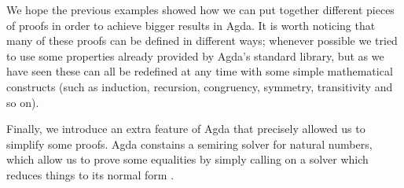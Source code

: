 {We hope the previous examples showed how we can put together different pieces of proofs in order to achieve bigger results in Agda. It is worth noticing that many of these proofs can be defined in different ways; whenever possible we tried to use some properties already provided by Agda's standard library, but as we have seen these can all be redefined at any time with some simple mathematical constructs (such as induction, recursion, congruency, symmetry, transitivity and so on).

Finally, we introduce an extra feature of Agda that precisely allowed us to simplify some proofs. Agda constains a semiring solver for natural numbers, which allow us to prove some equalities by simply calling on a solver which reduces things to its normal form \cite{2018UsingSolver}.

\begin{code}%
\>[0]\AgdaSpace{}%
\<%
\\
\>[0]\AgdaSpace{}%
\<%
\\
\>[0][@{}l@{\AgdaIndent{0}}]%
\>[2]\AgdaSpace{}%
\AgdaSymbol{(}\AgdaSymbol{;}\AgdaSpace{}%
\AgdaSymbol{;}\AgdaSpace{}%
\AgdaOperator{\AgdaFunction{\AgdaUnderscore{}:=\AgdaUnderscore{}}}\AgdaSymbol{;}\AgdaSpace{}%
\AgdaSymbol{;}\AgdaSpace{}%
\AgdaSymbol{;}\AgdaSpace{}%
\AgdaOperator{\AgdaFunction{\AgdaUnderscore{}:+\AgdaUnderscore{}}}\AgdaSymbol{;}\AgdaSpace{}%
\AgdaOperator{\AgdaFunction{\AgdaUnderscore{}:*\AgdaUnderscore{}}}\AgdaSymbol{;}\AgdaSpace{}%
\AgdaOperator{\AgdaInductiveConstructor{:-\AgdaUnderscore{}}}\AgdaSymbol{;}\AgdaSpace{}%
\AgdaOperator{\AgdaFunction{\AgdaUnderscore{}:-\AgdaUnderscore{}}}\AgdaSymbol{)}\<%
\\
%
\\[\AgdaEmptyExtraSkip]%
\>[0]\<%
\\
\>[0]\<%
\\
\>[0]\<%
\\
\>[0]\<%
\\
\>[0]\<%
\\
\>[0]\<%
\\
\>[0]\<%
\end{code}

}

